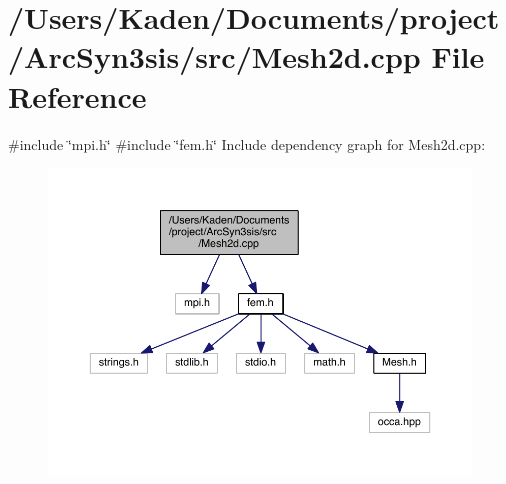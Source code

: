\hypertarget{a00581}{}\section{/\+Users/\+Kaden/\+Documents/project/\+Arc\+Syn3sis/src/\+Mesh2d.cpp File Reference}
\label{a00581}
{\ttfamily \#include \char`\"{}mpi.\+h\char`\"{}}\newline
{\ttfamily \#include \char`\"{}fem.\+h\char`\"{}}\newline
Include dependency graph for Mesh2d.\+cpp\+:\nopagebreak
\begin{figure}[H]
\begin{center}
\leavevmode
\includegraphics[width=350pt]{a00582}
\end{center}
\end{figure}
